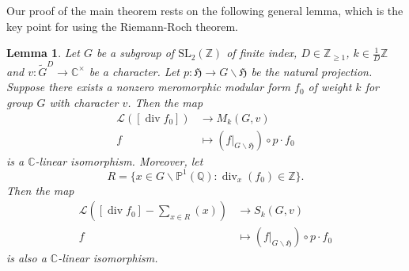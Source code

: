 \documentclass[12pt]{amsart}
\numberwithin{equation}{section}
\theoremstyle{plain}
\newtheorem{lemm}[thm]{Lemma}
\theoremstyle{definition}
\theoremstyle{remark}
\renewcommand\div{\mathop{\mathrm{div}}}
\newcommand\numZ{\mathbb{Z}}
\newcommand\numC{\mathbb{C}}
\newcommand\projQ{\mathbb{P}^1(\mathbb{Q})}
\newcommand\numgeq[2]{\mathbb{#1}_{\geq #2}}
\newcommand\slZ{\mathrm{SL}_2(\mathbb{Z})}
\newcommand\uhp{\mathfrak{H}}
\begin{document}
Our proof of the main theorem rests on the following general lemma, which is the key point for using the Riemann-Roch theorem.
\begin{lemm}
\label{lemm:LMcorrespond}
Let $G$ be a subgroup of $\slZ$ of finite index, $D\in\numgeq{Z}{1}$, $k\in\frac{1}{D}\numZ$ and $v\colon\widetilde{G}^D\to\numC^\times$ be a character. Let $p\colon\uhp\to G\backslash\uhp$ be the natural projection. Suppose there exists a nonzero meromorphic modular form $f_0$ of weight $k$ for group $G$ with character $v$. Then the map
\begin{align*}
\mathscr{L}([\div f_0]) &\to M_k(G,v)\\
f &\mapsto (f\vert_{G\backslash\uhp})\circ p \cdot f_0
\end{align*}
is a $\numC$-linear isomorphism. Moreover, let
\begin{equation}
\label{eq:R}
R=\{x\in G\backslash\projQ\colon \div\nolimits_x(f_0)\in\numZ\}.
\end{equation}
Then the map
\begin{align*}
\mathscr{L}\left([\div f_0]-\sum\nolimits_{x\in R}(x)\right) &\to S_k(G,v)\\
f &\mapsto (f\vert_{G\backslash\uhp})\circ p \cdot f_0
\end{align*}
is also a $\numC$-linear isomorphism.
\end{lemm}
\end{document}
